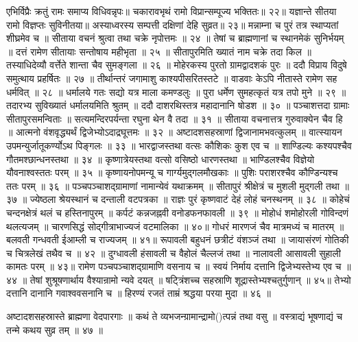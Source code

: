 एभिर्विप्रैः क्रतुं रामः समाप्य विधिवन्नृपः॥
चकारावभृथं रामो विप्रान्सम्पूज्य भक्तितः॥ २२॥
यज्ञान्ते सीतया रामो विज्ञप्तः सुविनीतया॥
अस्याध्वरस्य सम्पत्ती दक्षिणां देहि सुव्रत॥ २३॥
मन्नाम्ना च पुरं तत्र स्थाप्यतां शीघ्रमेव च ॥
सीताया वचनं श्रुत्वा तथा चक्रे नृपोत्तमः ॥ २४ ॥
तेषां च ब्राह्मणानां च स्थानमेकं सुनिर्भयम् ॥
दत्तं रामेण सीतायाः सन्तोषाय महीभृता ॥ २५ ॥
सीतापुरमिति ख्यातं नाम चक्रे तदा किल ॥
तस्याधिदेव्यौ वर्त्तेते शान्ता चैव सुमङ्गला ॥ २६ ॥
मोहेरकस्य पुरतो ग्रामद्वादशकं पुरः ॥
ददौ विप्राय विदुषे समुत्थाय प्रहर्षितः ॥ २७ ॥
तीर्थान्तरं जगामाशु काश्यपीसरितस्तटे ॥
वाडवाः केऽपि नीतास्ते रामेण सह धर्मवित् ॥ २८ ॥
धर्मालये गतः सद्यो यत्र माला कमण्डलुः ॥
पुरा धर्मेण सुमहत्कृतं यत्र तपो मुने ॥ २९ ॥
तदारभ्य सुविख्यातं धर्मालयमिति श्रुतम् ॥
ददौ दाशरथिस्तत्र महादानानि षोडश ॥ ३० ॥
पञ्चाशत्तदा ग्रामाः सीतापुरसमन्विताः ॥
सत्यमन्दिरपर्यन्ता रघुना थेन वै तदा ॥ ३१ ॥
सीताया वचनात्तत्र गुरुवाक्येन चैव हि ॥
आत्मनो वंशवृद्ध्यर्थं द्विजेभ्योऽदाद्रघूत्तमः ॥ ३२ ॥
अष्टादशसहस्राणां द्विजानामभवत्कुलम् ॥
वात्स्यायन उपमन्युर्जातूकर्ण्योऽथ पिङ्गलः ॥ ३३ ॥
भारद्वाजस्तथा वत्सः कौशिकः कुश एव च ॥
शाण्डिल्यः कश्यपश्चैव गौतमश्छान्धनस्तथा ॥ ३४ ॥
कृष्णात्रेयस्तथा वत्सो वसिष्ठो धारणस्तथा ॥
भाण्डिलश्चैव विज्ञेयो यौवनाश्वस्ततः परम् ॥ ३५ ॥
कृष्णायनोपमन्यू च गार्ग्यमुद्गलमौखकाः ॥
पुशिः पराशरश्चैव कौण्डिन्यश्च ततः परम् ॥ ३६ ॥
पञ्चपञ्चाशद्ग्रामाणां नामान्येवं यथाक्रमम् ॥
सीतापुरं श्रीक्षेत्रं च मुशली मुद्गली तथा ॥ ३७ ॥
ज्येष्ठला श्रेयस्थानं च दन्ताली वटपत्रका ॥
राज्ञः पुरं कृष्णवाटं देहं लोहं चनस्थनम् ॥ ३८ ॥
कोहेचं चन्दनक्षेत्रं थलं च हस्तिनापुरम् ॥
कर्पटं कन्नजह्नवी वनोडफनफावली ॥ ३९ ॥
मोहोधं शमोहोरली गोविन्दणं थलत्यजम् ॥
चारणसिद्धं सोद्गीत्राभाज्यजं वटमालिका ॥ ४०॥
गोधरं मारणजं चैव मात्रमध्यं च मातरम् ॥
बलवती गन्धवती ईआम्ली च राज्यजम् ॥ ४१॥
रूपावली बहुधनं छत्रीटं वंशञ्जं तथा ॥
जायासंरणं गोतिकी च चित्रलेखं तथैव च ॥ ४२ ॥
दुग्धावली हंसावली च वैहोलं चैल्लजं तथा ॥
नालावली आसावली सुहाली कामतः परम् ॥ ४३॥
रामेण पञ्चपञ्चाशद्ग्रामाणि वसनाय च ॥
स्वयं निर्माय दत्तानि द्विजेभ्यस्तेभ्य एव च ॥ ४४ ॥
तेषां शुश्रूषणार्थाय वैश्यान्रामो न्यवे दयत् ॥
षट्त्रिंशच्च सहस्राणि शूद्रास्तेभ्यश्चतुर्गुणान् ॥ ४५॥
तेभ्यो दत्तानि दानानि गवाश्ववसनानि च ॥
हिरण्यं रजतं ताम्रं श्रद्धया परया मुदा ॥ ४६ ॥

अष्टादशसहस्रास्ते ब्राह्मणा वेदपारगाः ॥
कथं ते व्यभजन्ग्रामान्द्रामो()त्पन्नं तथा वसु ॥
वस्त्राद्यं भूषणाद्यं च तन्मे कथय सुव्र तम् ॥ ४७ ॥

